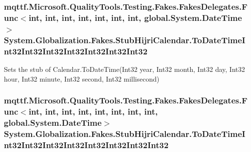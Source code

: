\hypertarget{class_system_1_1_globalization_1_1_fakes_1_1_stub_hijri_calendar_a95f139e14676cdbf6ce88877c7b25dbf}{
\subsubsection[{To\-Date\-Time\-Int32\-Int32\-Int32\-Int32\-Int32\-Int32\-Int32}]{\setlength{\rightskip}{0pt plus 5cm}mqttf.\-Microsoft.\-Quality\-Tools.\-Testing.\-Fakes.\-Fakes\-Delegates.\-Func$<$int, int, int, int, int, int, int, global.\-System.\-Date\-Time$>$ System.\-Globalization.\-Fakes.\-Stub\-Hijri\-Calendar.\-To\-Date\-Time\-Int32\-Int32\-Int32\-Int32\-Int32\-Int32\-Int32}}\label{class_system_1_1_globalization_1_1_fakes_1_1_stub_hijri_calendar_a95f139e14676cdbf6ce88877c7b25dbf}


Sets the stub of Calendar.\-To\-Date\-Time(\-Int32 year, Int32 month, Int32 day, Int32 hour, Int32 minute, Int32 second, Int32 millisecond)

\hypertarget{class_system_1_1_globalization_1_1_fakes_1_1_stub_hijri_calendar_a31540cf1ed0791aa76ea0318e0c9dc25}{
\subsubsection[{To\-Date\-Time\-Int32\-Int32\-Int32\-Int32\-Int32\-Int32\-Int32\-Int32}]{\setlength{\rightskip}{0pt plus 5cm}mqttf.\-Microsoft.\-Quality\-Tools.\-Testing.\-Fakes.\-Fakes\-Delegates.\-Func$<$int, int, int, int, int, int, int, int, global.\-System.\-Date\-Time$>$ System.\-Globalization.\-Fakes.\-Stub\-Hijri\-Calendar.\-To\-Date\-Time\-Int32\-Int32\-Int32\-Int32\-Int32\-Int32\-Int32\-Int32}}\label{class_system_1_1_globalization_1_1_fakes_1_1_stub_hijri_calendar_a31540cf1ed0791aa76ea0318e0c9dc25}


